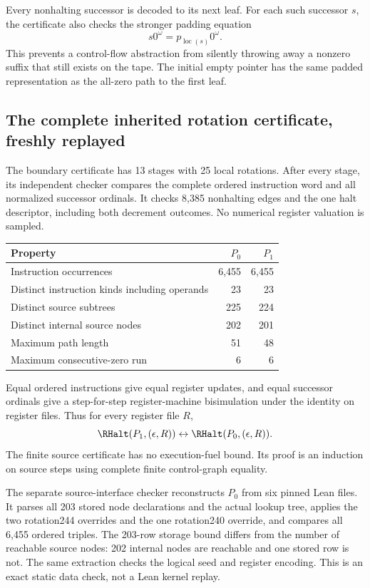 Every nonhalting successor is decoded to its next leaf. For each such
successor $s$, the certificate also checks the stronger padding equation
\[
             s0^\omega=p_{\operatorname{loc}(s)}0^\omega.
\]
This prevents a control-flow abstraction from silently throwing away a
nonzero suffix that still exists on the tape. The initial empty pointer
has the same padded representation as the all-zero path to the first
leaf.

\subsection{The complete inherited rotation certificate, freshly replayed}

The boundary certificate has 13 stages with 25 local rotations. After
every stage, its independent checker compares the complete ordered
instruction word and all normalized successor ordinals. It checks 8,385
nonhalting edges and the one halt descriptor, including both decrement
outcomes. No numerical register valuation is sampled.

\begin{center}
\begin{tabular}{lrr}
\toprule
Property&$P_0$&$P_1$\\
\midrule
Instruction occurrences&6,455&6,455\\
Distinct instruction kinds including operands&23&23\\
Distinct source subtrees&225&224\\
Distinct internal source nodes&202&201\\
Maximum path length&51&48\\
Maximum consecutive-zero run&6&6\\
\bottomrule
\end{tabular}
\end{center}

Equal ordered instructions give equal register updates, and equal
successor ordinals give a step-for-step register-machine bisimulation
under the identity on register files. Thus for every register file $R$,
\[
 \RHalt(P_1,(\epsilon,R))\leftrightarrow
 \RHalt(P_0,(\epsilon,R)).
\]
The finite source certificate has no execution-fuel bound. Its proof is
an induction on source steps using complete finite control-graph equality.

The separate source-interface checker reconstructs $P_0$ from six
pinned Lean files. It parses all 203 stored node declarations and the
actual lookup tree, applies the two rotation244 overrides and the one
rotation240 override, and compares all 6,455 ordered triples. The
203-row storage bound differs from the number of reachable source
nodes: 202 internal nodes are reachable and one stored row is not.
The same extraction checks the logical seed and register encoding.
This is an exact static data check, not a Lean kernel replay.

